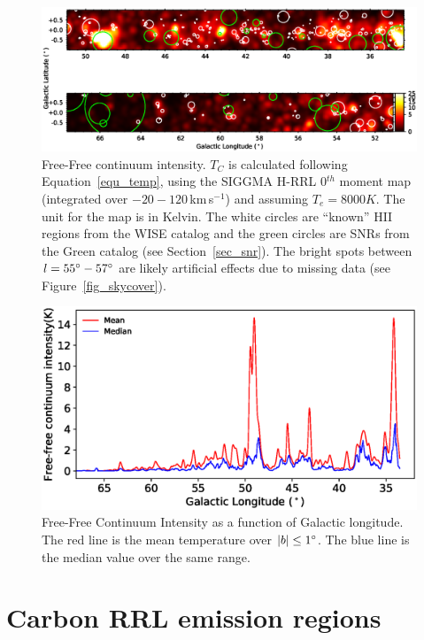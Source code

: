 \documentclass[manuscript]{aastex61}
\newcommand{\kms}{\,km\,s$^{-1}$}
\begin{document}
\begin{figure}[htbp]
\centering
\includegraphics[width = 7in]{temperature_thermal_map.eps}
\caption{Free-Free continuum intensity. $T_{C}$ is calculated following Equation~\ref{equ_temp}, using the SIGGMA H-RRL 0$^{th}$ moment map (integrated over $-20 - 120$\kms) and assuming $T_e = 8000 K$. The unit for the map is in Kelvin. The white circles are ``known'' HII regions from the WISE catalog and the green circles are SNRs from the Green catalog (see Section~\ref{sec_snr}). The bright spots between $l=55\mbox{$^\circ$}-57\mbox{$^\circ$}$ are likely artificial effects due to missing data (see Figure~\ref{fig_skycover}).}
\label{fig_gal_free}
\end{figure}
\begin{figure}[bhpt]
\centering
\includegraphics[width = 6in]{temperature_thermal_plot.eps}
\caption{Free-Free Continuum Intensity as a function of Galactic longitude. The red line is the mean temperature over $|b|\le 1\mbox{$^\circ$}$. The blue line is the median value over the same range.}
\label{fig_gal_plot}
\end{figure}

\section{Carbon RRL emission regions} \label{sec_crrl}
\end{document}
